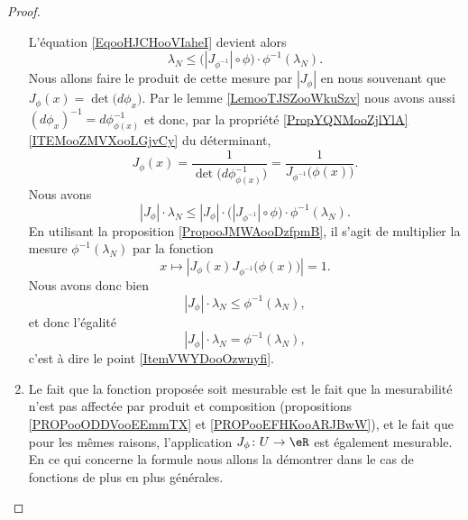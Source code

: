 \begin{proof}
\begin{enumerate}
\begin{subproof}
                L'équation \eqref{EqooHJCHooVIaheI} devient alors
                \begin{equation}
                    \lambda_N\leq \big( | J_{\phi^{-1}} |\circ\phi \big)\cdot \phi^{-1}(\lambda_N).
                \end{equation}
                Nous allons faire le produit de cette mesure par \( | J_{\phi} |\) en nous souvenant que \( J_{\phi}(x)=\det\big( d\phi_x \big)\). Par le lemme \ref{LemooTJSZooWkuSzv} nous avons aussi \(   (d\phi_x)^{-1}=d\phi^{-1}_{\phi(x)} \) et donc, par la propriété \ref{PropYQNMooZjlYlA}\ref{ITEMooZMVXooLGjvCy} du déterminant,
                \begin{equation}
                    J_{\phi}(x)=\frac{1}{ \det\big( d\phi^{-1}_{\phi(x)} \big) }=\frac{1}{ J_{\phi^{-1}}\big( \phi(x) \big) }.
                \end{equation}
                Nous avons
                \begin{equation}
                    | J_{\phi} |\cdot\lambda_N\leq | J_{\phi} |\cdot\big( | J_{\phi^{-1}} |\circ\phi \big)\cdot\phi^{-1}(\lambda_N).
                \end{equation}
                En utilisant la proposition \ref{PropooJMWAooDzfpmB}, il s'agit de multiplier la mesure \( \phi^{-1}(\lambda_N)\) par la fonction
                \begin{equation}
                    x\mapsto | J_{\phi}(x)J_{\phi^{-1}}\big( \phi(x) \big) |=1.
                \end{equation}
                Nous avons donc bien
                \begin{equation}
                    | J_{\phi} |\cdot \lambda_N\leq \phi^{-1}(\lambda_N),
                \end{equation}
                et donc l'égalité
                \begin{equation}
                    | J_{\phi} |\cdot\lambda_N=\phi^{-1}(\lambda_N),
                \end{equation}
                c'est à dire le point \ref{ItemVWYDooOzwnyfi}.
            \end{subproof}
        \item
            Le fait que la fonction proposée soit mesurable est le fait que la mesurabilité n'est pas affectée par produit et composition (propositions \ref{PROPooODDVooEEmmTX} et \ref{PROPooEFHKooARJBwW}), et le fait que pour les mêmes raisons, l'application \( J_{\phi}\colon U\to \eR\) est également mesurable. En ce qui concerne la formule nous allons la démontrer dans le cas de fonctions de plus en plus générales.

\end{enumerate}
\end{proof}
